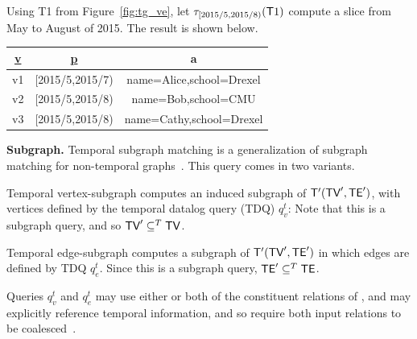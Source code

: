 

\begin{example}
\label{ex:slice}
Using T1 \tg from Figure~\ref{fig:tg_ve}, let
$\tau_{[2015/5,2015/8)}(\mathsf{T}1)$ compute a slice from May to August
  of 2015.  The result is shown below.
\begin{table}[h]
\begin{tabular}{c | c | c}
\hline
{\bfseries{\underline v}} & {\bfseries{\underline p}} & {\bfseries a} \\ \hline
v1 & [2015/5,2015/7) & name=Alice,school=Drexel \\ \hline
v2 & [2015/5,2015/8) & name=Bob,school=CMU \\ \hline
v3 & [2015/5,2015/8) & name=Cathy,school=Drexel \\ \hline
\end{tabular}
\end{table}
\end{example}

{\bf Subgraph.} Temporal subgraph matching is a generalization of
subgraph matching for non-temporal graphs~\cite{Wood2012}.  This query
comes in two variants.


Temporal vertex-subgraph  computes an induced
subgraph of \tve $\mathsf{T}'(\textsf{TV}', \textsf{TE}')$, with vertices defined by the
temporal datalog query (TDQ) $q^t_v$:  
Note that this is a
subgraph query, and so $\textsf{TV}' \subseteq^T \textsf{TV}$.

Temporal edge-subgraph  computes a subgraph of \ttt
$\mathsf{T}'(\textsf{TV}', \textsf{TE}')$ in which edges are defined by TDQ $q^t_e$.  Since
this is a subgraph query, $\textsf{TE}' \subseteq^T \textsf{TE}$.

Queries $q^t_v$ and $q^t_e$ may use either or both of the constituent
relations of \tve, and may explicitly reference temporal information,
and so require both input relations to be
coalesced~\cite{DBLP:reference/db/Bohlen09}.

